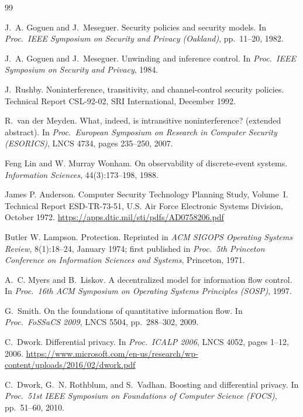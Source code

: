 \documentclass[11pt,a4paper]{article}
\theoremstyle{definition}
\begin{document}
\begin{thebibliography}{99}

 J.~A. Goguen and J.~Meseguer. Security policies and security models. In
\emph{Proc.\ IEEE Symposium on Security and Privacy (Oakland)}, pp.~11--20, 1982.

 J.~A. Goguen and J.~Meseguer. Unwinding and inference control. In
\emph{Proc.\ IEEE Symposium on Security and Privacy}, 1984.

 J.~Rushby. Noninterference, transitivity, and channel-control security policies.
Technical Report CSL-92-02, SRI International, December 1992.

 R.~van der Meyden. What, indeed, is intransitive noninterference? (extended abstract). In
\emph{Proc.\ European Symposium on Research in Computer Security (ESORICS)}, LNCS 4734, pages 235--250, 2007.

 Feng Lin and W. Murray Wonham.
\newblock On observability of discrete-event systems.
\newblock \textit{Information Sciences}, 44(3):173--198, 1988.

 James P. Anderson.
\newblock Computer Security Technology Planning Study, Volume~I.
\newblock Technical Report ESD-TR-73-51, U.S. Air Force Electronic Systems Division, October 1972.
\newblock \url{https://apps.dtic.mil/sti/pdfs/AD0758206.pdf}

 Butler W. Lampson. Protection. Reprinted in \emph{ACM SIGOPS Operating
Systems Review}, 8(1):18--24, January 1974; first published in \emph{Proc.\ 5th Princeton
Conference on Information Sciences and Systems}, Princeton, 1971.

 A.~C. Myers and B.~Liskov. A decentralized model for information flow
control. In \emph{Proc.\ 16th ACM Symposium on Operating Systems Principles (SOSP)}, 1997.

 G.~Smith. On the foundations of quantitative information flow. In \emph{Proc.\
FoSSaCS 2009}, LNCS 5504, pp.~288--302, 2009.

 C.~Dwork. Differential privacy. In \emph{Proc.\ ICALP 2006},
LNCS 4052, pages 1--12, 2006.
\url{https://www.microsoft.com/en-us/research/wp-content/uploads/2016/02/dwork.pdf}

 C.~Dwork, G.~N. Rothblum, and S.~Vadhan. Boosting and differential privacy. In
\emph{Proc.\ 51st IEEE Symposium on Foundations of Computer Science (FOCS)}, pp.~51--60, 2010.


\end{thebibliography}
\end{document}
